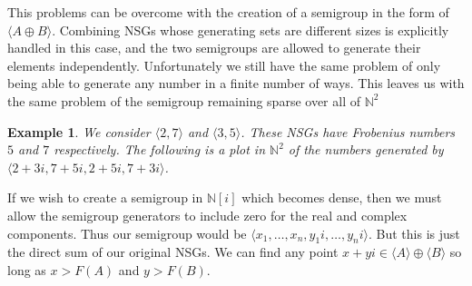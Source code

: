 \documentclass[11pt]{amsart}
\theoremstyle{plain}
\newtheorem{exa}{Example}
\theoremstyle{definition}
\begin{document}
This problems can be overcome with the  creation of a semigroup in the form of $\langle A\oplus B\rangle$. Combining NSGs whose generating sets are different sizes is explicitly handled in this case, and the two semigroups are allowed to generate their elements independently. Unfortunately we still have the same problem of only being able to generate any number in a finite number of ways. This leaves us with the same problem of the semigroup remaining sparse over all of $\mathbb{N}^2$
\begin{exa}
We consider $\langle 2,7\rangle$ and $\langle 3,5\rangle$. These NSGs have Frobenius numbers $5$ and $7$ respectively\cite{frobmask}. The following is a plot in $\mathbb{N}^2$ of the numbers generated by $\langle 2+3i,7+5i,2+5i,7+3i\rangle$.

\begin{center}
\end{center}
\end{exa}
If we wish to create a semigroup in $\mathbb{N}[i]$ which becomes dense, then we must allow the semigroup generators to include zero for the real and complex components.
Thus our semigroup would be $\langle x_1,\dots,x_n,y_1i,\dots,y_ni\rangle$.
But this is just the direct sum of our original NSGs.
We can find any point $x+yi\in \langle A\rangle\oplus \langle B\rangle$ so long as $x>F(A)$ and $y>F(B)$.
\end{document}
